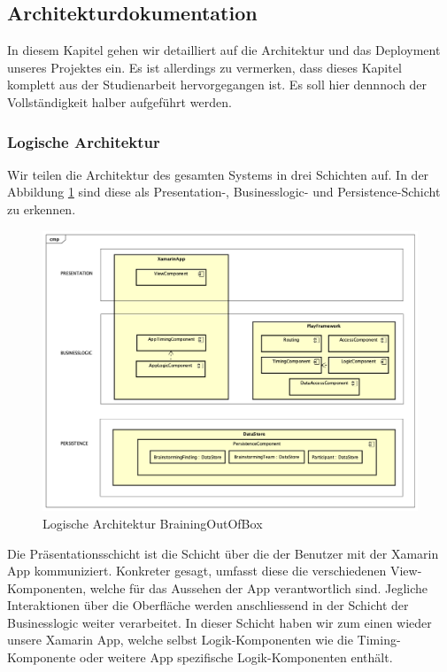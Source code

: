 \subsection{Architekturdokumentation}
\label{architektur}

In diesem Kapitel gehen wir detailliert auf die Architektur und das Deployment unseres Projektes ein. Es ist allerdings zu vermerken, dass dieses Kapitel komplett aus der Studienarbeit \cite{methode635-sa} hervorgegangen ist. Es soll hier dennnoch der Vollständigkeit halber aufgeführt werden.

\subsubsection{Logische Architektur}
Wir teilen die Architektur des gesamten Systems in drei Schichten auf. In der Abbildung \ref{fig:architektur-methode635} sind diese als Presentation-, Businesslogic- und Persistence-Schicht zu erkennen.

\begin{figure}[h]
	\centering
	\includegraphics[width=1\linewidth]{img/architektur/CD_Methode635}
	\caption{Logische Architektur BrainingOutOfBox}
	\label{fig:architektur-methode635}
\end{figure}

Die Präsentationsschicht ist die Schicht über die der Benutzer mit der Xamarin App kommuniziert. Konkreter gesagt, umfasst diese die verschiedenen View-Komponenten, welche für das Aussehen der App verantwortlich sind. Jegliche Interaktionen über die Oberfläche werden anschliessend in der Schicht der Businesslogic weiter verarbeitet. In dieser Schicht haben wir zum einen wieder unsere Xamarin App, welche selbst Logik-Komponenten wie die Timing-Komponente oder weitere App spezifische Logik-Komponenten enthält.

